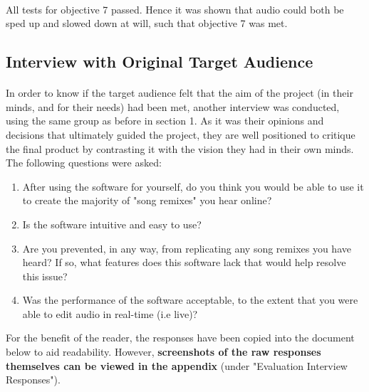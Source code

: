 \paragraph{}
All tests for objective 7 passed. Hence it was shown that audio could both be sped up and slowed down at will, such that objective 7 was met.

\pagebreak
\subsection{Interview with Original Target Audience}
\paragraph{}
In order to know if the target audience felt that the aim of the project (in their minds, and for their needs) had been met, another interview was conducted, using the same group as before in section 1.  As it was their opinions and decisions that ultimately guided the project, they are well positioned to critique the final product by contrasting it with the vision they had in their own minds. The following questions were asked:

\begin{enumerate}
	\item After using the software for yourself, do you think you would be able to use it to create the majority of "song remixes" you hear online?
	\item Is the software intuitive and easy to use?
	\item Are you prevented, in any way,  from replicating any song remixes you have heard? If so, what features does this software lack that would help resolve this issue?
	\item Was the performance of the software acceptable, to the extent that you were able to edit audio in real-time (i.e live)?
\end{enumerate}

For the benefit of the reader, the responses have been copied into the document below to aid readability. However, \textbf{screenshots of the raw responses themselves can be viewed in the appendix} (under "Evaluation Interview Responses").

